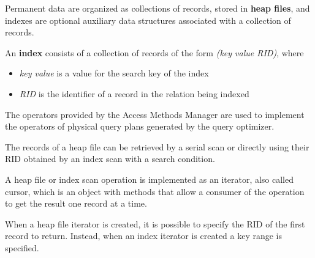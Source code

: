 Permanent data are organized as collections of records, stored in \textbf{heap files}, and indexes are optional auxiliary data structures associated with a collection of records.

An \textbf{index} consists of a collection of records of the form \textit{(key value RID)}, where
\begin{itemize}
    \item \textit{key value} is a value for the search key of the index
    \item \textit{RID} is the identifier of a record in the relation being indexed
\end{itemize}
The operators provided by the Access Methods Manager are used to implement the operators of physical query plans generated by the query optimizer.

The records of a heap file can be retrieved by a serial scan or directly using their RID obtained by an index scan with a search condition.

A heap file or index scan operation is implemented as an iterator, also called cursor, which is an object with methods that allow a consumer of the operation to get the result one record at a time.

When a heap file iterator is created, it is possible to specify the RID of the first record to return. Instead, when an index iterator is created a key range is specified.
